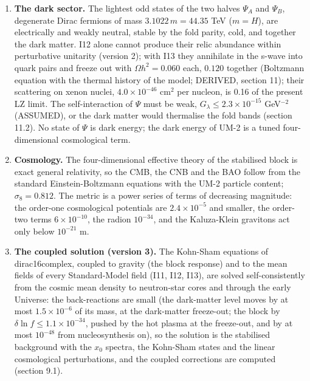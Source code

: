 \documentclass[
  10pt,
]{article}
\begin{document}
\begin{enumerate}
  massless fold bands by freeze-in, \(\Delta N_{eff} = 0.001\)); and
  (version 3) an \(x_0\)-chiral vector portal I13 couples the current
  \(i\bar\Psi\gamma^MP_b\Psi\) (\(M \ne x_0\)), which vanishes on the
  fold bands, to the baryon-number current (\(G_A = 1.28\times10^{-9}\)
  GeV\(^{-2}\)). The chiral tip \(Z\) portal of version 1 is removed:
  with three neutrinos it has no role, it is bounded by the \(Z\) width
  and disfavoured by \(N_{eff}\) (section 5.7).
\item
  \textbf{The dark sector.} The lightest odd states of the two halves
  \(\Psi_A\) and \(\Psi_B\), degenerate Dirac fermions of mass
  \(3.1022\,m = 44.35\) TeV (\(m = H\)), are electrically and weakly
  neutral, stable by the fold parity, cold, and together the dark
  matter. I12 alone cannot produce their relic abundance within
  perturbative unitarity (version 2); with I13 they annihilate in the
  s-wave into quark pairs and freeze out with \(\Omega h^2 = 0.060\)
  each, \(0.120\) together (Boltzmann equation with the thermal history
  of the model; DERIVED, section 11); their scattering on xenon nuclei,
  \(4.0\times10^{-46}\) cm\(^2\) per nucleon, is 0.16 of the present LZ
  limit. The self-interaction of \(\Psi\) must be weak,
  \(G_\lambda \le 2.3\times10^{-15}\) GeV\(^{-2}\) (ASSUMED), or the
  dark matter would thermalise the fold bands (section 11.2). No state
  of \(\Psi\) is dark energy; the dark energy of UM-2 is a tuned
  four-dimensional cosmological term.
\item
  \textbf{Cosmology.} The four-dimensional effective theory of the
  stabilised block is exact general relativity, so the CMB, the CNB and
  the BAO follow from the standard Einstein-Boltzmann equations with the
  UM-2 particle content; \(\sigma_8 = 0.812\). The metric is a power
  series of terms of decreasing magnitude: the order-one cosmological
  potentials are \(2.4\times10^{-5}\) and smaller, the order-two terms
  \(6\times10^{-10}\), the radion \(10^{-34}\), and the Kaluza-Klein
  gravitons act only below \(10^{-21}\) m.
\item
  \textbf{The coupled solution (version 3).} The Kohn-Sham equations of
  dirac16complex, coupled to gravity (the block response) and to the
  mean fields of every Standard-Model field (I11, I12, I13), are solved
  self-consistently from the cosmic mean density to neutron-star cores
  and through the early Universe: the back-reactions are small (the
  dark-matter level moves by at most \(1.5\times10^{-6}\) of its mass,
  at the dark-matter freeze-out; the block by
  \(\delta\ln f \le 1.1\times10^{-34}\), pushed by the hot plasma at the
  freeze-out, and by at most \(10^{-48}\) from nucleosynthesis on), so
  the solution is the stabilised background with the \(x_0\) spectra,
  the Kohn-Sham states and the linear cosmological perturbations, and
  the coupled corrections are computed (section 9.1).
\end{enumerate}
\end{document}
